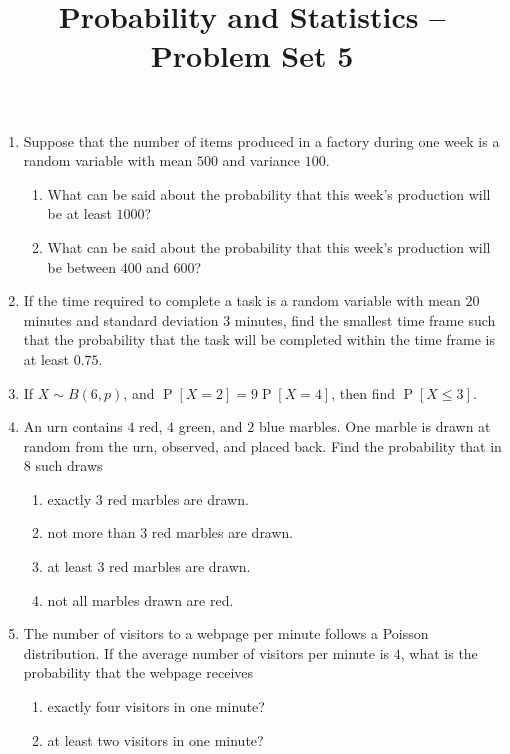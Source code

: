 \documentclass[svgnames]{amsart}
\title[]{Probability and Statistics -- Problem Set 5}
\DeclareMathOperator{\Prob}{P}
\begin{document}
\maketitle
\begin{enumerate}[leftmargin=*]
\item Suppose that the number of items produced in a factory during one week is a random variable with mean $500$ and variance $100$.
\begin{enumerate}
	\item What can be said about the probability that this week's production will be at least $1000$?
	\item What can be said about the probability that this week's production will be between $400$ and $600$?
\end{enumerate}

\item If the time required to complete a task is a random variable with mean $20$ minutes and standard deviation $3$ minutes, find the smallest time frame such that the probability that the task will be completed within the time frame is at least $0.75$.

\item If $X \sim B(6, p)$, and $\Prob[X = 2] = 9 \Prob[X = 4]$, then find $\Prob[X \le 3]$.

\item An urn contains $4$ red, $4$ green, and $2$ blue marbles. One marble is drawn at random from the urn, observed, and placed back. Find the probability that in $8$ such draws
\begin{enumerate}
    \item exactly $3$ red marbles are drawn.
    \item not more than $3$ red marbles are drawn.
    \item at least $3$ red marbles are drawn.
    \item not all marbles drawn are red.
\end{enumerate}

\item The number of visitors to a webpage per minute follows a Poisson distribution. If the average number of visitors per minute is $4$, what is the probability that the webpage receives
\begin{enumerate}[label=(\roman*)]
	\item exactly four visitors in one minute?
	\item at least two visitors in one minute?
\end{enumerate}


\end{enumerate}
\end{document}
